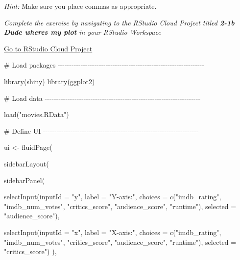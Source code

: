 \documentclass[
  letterpaper,
  DIV=11,
  numbers=noendperiod]{scrreprt}
\newenvironment{Shaded}{\begin{snugshade}}{\end{snugshade}}
\newcommand{\AttributeTok}[1]{\textcolor[rgb]{0.40,0.46,0.14}{#1}}
\newcommand{\CommentTok}[1]{\textcolor[rgb]{0.37,0.37,0.37}{#1}}
\newcommand{\FunctionTok}[1]{\textcolor[rgb]{0.28,0.35,0.67}{#1}}
\newcommand{\NormalTok}[1]{\textcolor[rgb]{0.00,0.46,0.62}{#1}}
\newcommand{\OtherTok}[1]{\textcolor[rgb]{0.00,0.46,0.62}{#1}}
\newcommand{\StringTok}[1]{\textcolor[rgb]{0.13,0.47,0.30}{#1}}
\begin{document}
\emph{Hint:} Make sure you place commas as appropriate.

\emph{Complete the exercise by navigating to the RStudio Cloud Project
titled \textbf{2-1b Dude wheres my plot} in your RStudio Workspace}

\href{https://rstudio.cloud/spaces/81721/join?access_code=I4VJaNsKfTqR3Td9hLP7E1nz8\%2FtMg6Xbw9Bgqumv}{
Go to RStudio Cloud Project}

\begin{Shaded}
\begin{Highlighting}[]
\CommentTok{\# Load packages {-}{-}{-}{-}{-}{-}{-}{-}{-}{-}{-}{-}{-}{-}{-}{-}{-}{-}{-}{-}{-}{-}{-}{-}{-}{-}{-}{-}{-}{-}{-}{-}{-}{-}{-}{-}{-}{-}{-}{-}{-}{-}{-}{-}{-}{-}{-}{-}{-}{-}{-}{-}{-}{-}{-}{-}{-}{-}{-}{-}{-}{-}{-}{-}}

\FunctionTok{library}\NormalTok{(shiny)}
\FunctionTok{library}\NormalTok{(ggplot2)}

\CommentTok{\# Load data {-}{-}{-}{-}{-}{-}{-}{-}{-}{-}{-}{-}{-}{-}{-}{-}{-}{-}{-}{-}{-}{-}{-}{-}{-}{-}{-}{-}{-}{-}{-}{-}{-}{-}{-}{-}{-}{-}{-}{-}{-}{-}{-}{-}{-}{-}{-}{-}{-}{-}{-}{-}{-}{-}{-}{-}{-}{-}{-}{-}{-}{-}{-}{-}{-}{-}{-}{-}}

\FunctionTok{load}\NormalTok{(}\StringTok{"movies.RData"}\NormalTok{)}

\CommentTok{\# Define UI {-}{-}{-}{-}{-}{-}{-}{-}{-}{-}{-}{-}{-}{-}{-}{-}{-}{-}{-}{-}{-}{-}{-}{-}{-}{-}{-}{-}{-}{-}{-}{-}{-}{-}{-}{-}{-}{-}{-}{-}{-}{-}{-}{-}{-}{-}{-}{-}{-}{-}{-}{-}{-}{-}{-}{-}{-}{-}{-}{-}{-}{-}{-}{-}{-}{-}{-}{-}}

\NormalTok{ui }\OtherTok{\textless{}{-}} \FunctionTok{fluidPage}\NormalTok{(}
  
  \FunctionTok{sidebarLayout}\NormalTok{(}
    
    \FunctionTok{sidebarPanel}\NormalTok{(}
      
      \FunctionTok{selectInput}\NormalTok{(}\AttributeTok{inputId =} \StringTok{"y"}\NormalTok{,}
                  \AttributeTok{label =} \StringTok{"Y{-}axis:"}\NormalTok{,}
                  \AttributeTok{choices =} \FunctionTok{c}\NormalTok{(}\StringTok{"imdb\_rating"}\NormalTok{, }\StringTok{"imdb\_num\_votes"}\NormalTok{, }\StringTok{"critics\_score"}\NormalTok{, }\StringTok{"audience\_score"}\NormalTok{, }\StringTok{"runtime"}\NormalTok{),}
                  \AttributeTok{selected =} \StringTok{"audience\_score"}\NormalTok{),}
      
      \FunctionTok{selectInput}\NormalTok{(}\AttributeTok{inputId =} \StringTok{"x"}\NormalTok{,}
                  \AttributeTok{label =} \StringTok{"X{-}axis:"}\NormalTok{,}
                  \AttributeTok{choices =} \FunctionTok{c}\NormalTok{(}\StringTok{"imdb\_rating"}\NormalTok{, }\StringTok{"imdb\_num\_votes"}\NormalTok{, }\StringTok{"critics\_score"}\NormalTok{, }\StringTok{"audience\_score"}\NormalTok{, }\StringTok{"runtime"}\NormalTok{),}
                  \AttributeTok{selected =} \StringTok{"critics\_score"}\NormalTok{)}
\NormalTok{    ),}
    

\end{Highlighting}
\end{Shaded}
\end{document}
